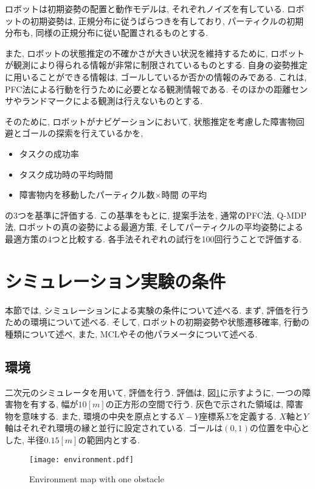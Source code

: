 ロボットは初期姿勢の配置と動作モデルは, それぞれノイズを有している. 
ロボットの初期姿勢は, 正規分布に従うばらつきを有しており, 
パーティクルの初期分布も, 同様の正規分布に従い配置されるものとする. 

また, ロボットの状態推定の不確かさが大きい状況を維持するために, 
ロボットが観測により得られる情報が非常に制限されているものとする. 
自身の姿勢推定に用いることができる情報は, ゴールしているか否かの情報のみである. 
これは, PFC法による行動を行うために必要となる観測情報である. 
そのほかの距離センサやランドマークによる観測は行えないものとする. 

そのために, ロボットがナビゲーションにおいて, 状態推定を考慮した障害物回避とゴールの探索を行えているかを, 
\begin{itemize}
  \item タスクの成功率
  \item タスク成功時の平均時間
  \item 障害物内を移動したパーティクル数×時間 の平均
\end{itemize}
の3つを基準に評価する. 
この基準をもとに, 提案手法を, 通常のPFC法, Q-MDP法, ロボットの真の姿勢による最適方策, 
そしてパーティクルの平均姿勢による最適方策の4つと比較する. 
各手法それぞれの試行を100回行うことで評価する. 


\section{シミュレーション実験の条件} \label{section:実験条件}
本節では, シミュレーションによる実験の条件について述べる. 
まず, 評価を行うための環境について述べる. 
そして, ロボットの初期姿勢や状態遷移確率, 行動の種類について述べ, また, MCLやその他パラメータについて述べる. 

\subsection{環境}
二次元のシミュレータを用いて, 評価を行う. 
評価は, 図\ref{fig:environment}に示すように, 一つの障害物を有する, 幅が$10[\si{m}]$の正方形の空間で行う. 
灰色で示された領域は, 障害物を意味する. 
また, 環境の中央を原点とする$X-Y$座標系$\Sigma$を定義する. 
$X$軸と$Y$軸はそれぞれ環境の縁と並行に設定されている. 
ゴールは$(0, 1)$の位置を中心とした, 半径$0.15[\si{m}]$の範囲内とする. 
\begin{figure}[h]
  \begin{center}
    \texttt{[image: environment.pdf]}
    \caption{Environment map with one obstacle}
    \label{fig:environment}
  \end{center}
\end{figure}

